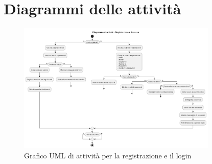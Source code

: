 \documentclass[12pt,a4paper,oneside]{report}
\begin{document}
\section{Diagrammi delle attività}
\begin{figure}[H]
    \centering
    \includegraphics[width=0.85\textwidth]{images/uml/RegistrationLogin.png}
    \caption{Grafico UML di attività per la registrazione e il login}
    \label{fig:uml-act-graph}
\end{figure}
\end{document}
